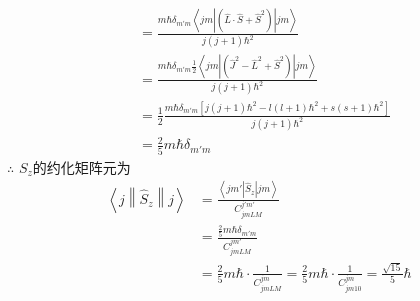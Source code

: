 \documentclass[12pt]{article}
\numberwithin{equation}{section}	 %
\begin{document}
\begin{spacing}{1.5}
\begin{align*}
&= \frac{m\hbar\delta_{m'm} \left<jm\left|(\hat{L}\cdot\hat{S}+\hat{S}^{2})\right|jm\right>}{j(j+1)\hbar^{2}} \\
&= \frac{m\hbar\delta_{m'm} \displaystyle\frac{1}{2} \left<jm\left|(\hat{J}^{2}- \hat{L}^{2}+\hat{S}^{2})\right|jm\right>}{j(j+1)\hbar^{2}} \\
&= \frac{1}{2}\frac{m\hbar\delta_{m'm} [j(j+1)\hbar^{2}-l(l+1)\hbar^{2}+s(s+1)\hbar^{2}] }{j(j+1)\hbar^{2}} \\
&= \frac{2}{5}m\hbar\delta_{m'm}
\end{align*}
$\therefore$ $S_{z}$的约化矩阵元为
\begin{align*}
\left<j\left\|\hat{S}_{z}\right\|j\right> &= \frac{\left<jm'\left|\hat{S}_{z}\right|jm\right>}{C_{jmLM}^{j'm'}} \\
&= \frac{\displaystyle \frac{2}{5}m\hbar\delta_{m'm}}{C_{jmLM}^{jm'}} \\
&= \frac{2}{5}m\hbar \cdot \frac{1}{C_{jmLM}^{jm}} = \frac{2}{5}m\hbar \cdot \frac{1}{C_{jm10}^{jm}} = \frac{\sqrt{15}}{5}\hbar
\end{align*}
~\\
~\\



\end{spacing}
\end{document}
